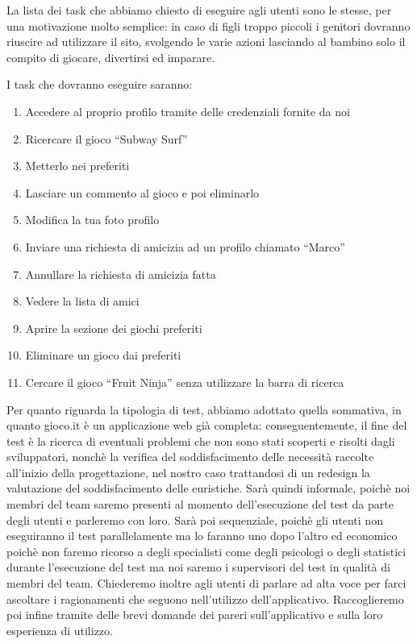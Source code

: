 \documentclass[../Report.tex]{subfiles}
\begin{document}
    La lista dei task che abbiamo chiesto di eseguire agli utenti sono le stesse, per una motivazione molto semplice: in caso di figli troppo piccoli i genitori dovranno riuscire ad utilizzare il sito, svolgendo le varie azioni lasciando al bambino solo il compito di giocare, divertirsi ed imparare. 

    I task che dovranno eseguire saranno:
    \begin{enumerate}
        \item Accedere al proprio profilo tramite delle credenziali fornite da noi
        \item  Ricercare il gioco “Subway Surf”
        \item Metterlo nei preferiti 
        \item Lasciare un commento al gioco e poi eliminarlo 
        \item Modifica la tua foto profilo
        \item Inviare una richiesta di amicizia ad un profilo chiamato “Marco”
        \item Annullare la richiesta di amicizia fatta
        \item Vedere la lista di amici
        \item Aprire la sezione dei giochi preferiti 
        \item Eliminare un gioco dai preferiti 
        \item Cercare il gioco “Fruit Ninja” senza utilizzare la barra di ricerca
        
    \end{enumerate}

    Per quanto riguarda la tipologia di test, abbiamo adottato quella sommativa, in quanto gioco.it è un applicazione web già completa: conseguentemente, il fine del test è la ricerca di eventuali problemi che non sono stati scoperti e risolti dagli sviluppatori, nonchè la verifica del soddisfacimento delle necessità raccolte all’inizio della progettazione, nel nostro caso trattandosi di un redesign la valutazione del soddisfacimento delle euristiche. 
    Sarà quindi informale, poichè noi membri del team saremo presenti al momento dell’esecuzione del test da parte degli utenti e parleremo con loro. Sarà poi sequenziale, poichè gli utenti non eseguiranno il test parallelamente ma lo faranno uno dopo l’altro ed economico poichè non faremo ricorso a degli specialisti come degli psicologi o degli statistici durante l’esecuzione del test ma noi saremo i supervisori del test in qualità di membri del team. 
    Chiederemo inoltre agli utenti di parlare ad alta voce per farci ascoltare i ragionamenti che seguono nell’utilizzo dell’applicativo. Raccoglieremo poi infine tramite delle brevi domande dei pareri sull’applicativo e sulla loro esperienza di utilizzo.
\end{document}
